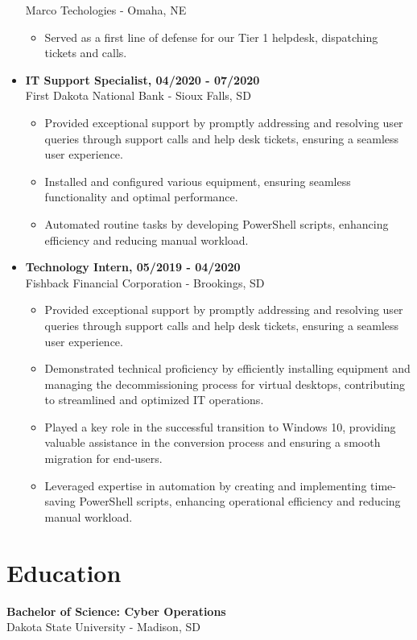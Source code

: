 \documentclass[a4paper,10pt]{article}
\begin{document}
\begin{itemize}
    Marco Techologies - Omaha, NE
    \begin{itemize}
        \small
        \leftskip=4em
        \item Served as a first line of defense for our Tier 1 helpdesk, dispatching tickets and calls.
    \end{itemize}
    \item\textbf{IT Support Specialist, 04/2020 - 07/2020} \\
    First Dakota National Bank - Sioux Falls, SD
    \begin{itemize}
        \small
        \leftskip=4em
        \item Provided exceptional support by promptly addressing and resolving user queries through support calls and help desk tickets, ensuring a seamless user experience.
        \item Installed and configured various equipment, ensuring seamless functionality and optimal performance.
        \item Automated routine tasks by developing PowerShell scripts, enhancing efficiency and reducing manual workload.
    \end{itemize}
    \item\textbf{Technology Intern, 05/2019 - 04/2020} \\
    Fishback Financial Corporation - Brookings, SD 
    \begin{itemize}
        \small
        \leftskip=4em
        \item Provided exceptional support by promptly addressing and resolving user queries through support calls and help desk tickets, ensuring a seamless user experience.
        \item Demonstrated technical proficiency by efficiently installing equipment and managing the decommissioning process for virtual desktops, contributing to streamlined and optimized IT operations.
        \item Played a key role in the successful transition to Windows 10, providing valuable assistance in the conversion process and ensuring a smooth migration for end-users.
        \item Leveraged expertise in automation by creating and implementing time-saving PowerShell scripts, enhancing operational efficiency and reducing manual workload.
    \end{itemize}
\end{itemize}

\section*{Education}
\textbf{Bachelor of Science: Cyber Operations} \\
Dakota State University - Madison, SD 
\end{document}
